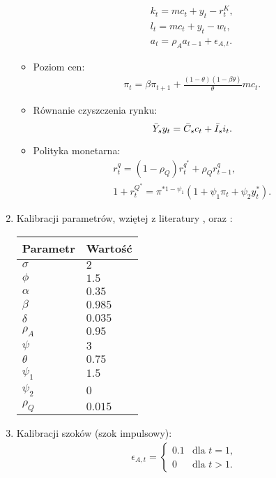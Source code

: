 \begin{enumerate}
\begin{itemize}
\begin{gather}
            k_t = mc_t + y_t - r^K_t,\\
            l_t = mc_t + y_t - w_t,\\
            a_t = \rho_A a_{t-1} + \epsilon_{A,t}.
        \end{gather}
        \item Poziom cen:
        \begin{gather}
            \pi_t = \beta \pi_{t+1} + \frac{(1-\theta)(1-\beta \theta)}{\theta}mc_t.
        \end{gather}
        \item Równanie czyszczenia rynku:
        \begin{equation}
            \bar{Y}_sy_t = \bar{C}_s c_t + \bar{I}_s i_t.
        \end{equation}
        \item Polityka monetarna:
        \begin{gather}
            r^q_t = (1-\rho_Q)r^{q^*}_t + \rho_Q r^q_{t-1}, \label{eq:monetary_nek_full_final}\\
            1 + r^{Q^*}_t = \pi^{*1-\psi_1} ( 1 + \psi_1 \pi_t + \psi_2 y^*_t).
        \end{gather}
    \end{itemize}
    \item Kalibracji parametrów, wziętej z literatury \cite{costaBook}, \cite{gali_gov_spending} oraz \cite{gali}:
        \begin{center}
            \begin{tabular}{|p{}|p{}|}
                \hline
                Parametr & Wartość \\
                \hline 
                $\sigma$ & $2$\\
                $\phi$ & $1.5$ \\
                $\alpha$ & $0.35$ \\
                $\beta$ & $0.985$ \\
                $\delta$ & $0.035$ \\
                $\rho_A$ & $0.95$ \\
                $\psi$ & $3$ \\
                $\theta$ & $0.75$ \\
                $\psi_1$ & $1.5$ \\
                $\psi_2$ & $0$ \\
                $\rho_Q$ & $0.015$ \\
                \hline 
            \end{tabular} 
         \end{center}
    \item Kalibracji szoków (szok impulsowy):
    \begin{gather}
        \epsilon_{A,t} =
        \begin{cases}
            0.1 & \text{dla $t = 1$,} \\
            0 & \text{dla $t > 1$.}
        \end{cases}
    \end{gather}
\end{enumerate}

